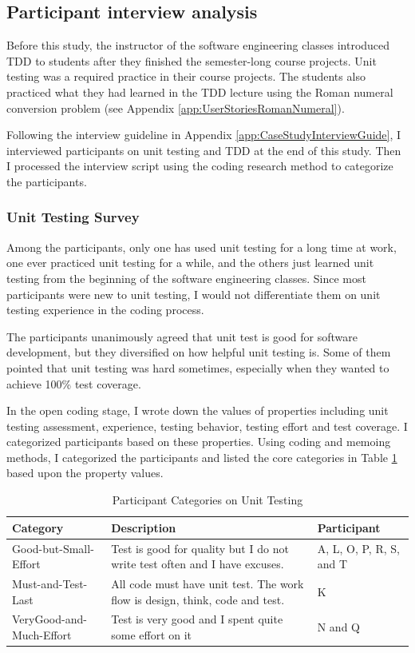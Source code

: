 \subsection{Participant interview analysis}
\label{subsec:ParticipantInterviewAnalysis}
Before this study, the instructor of the software engineering classes 
introduced TDD to students after they finished the semester-long course 
projects. Unit testing was a required practice in their course projects.
The students also practiced what they had learned in the TDD lecture using 
the Roman numeral conversion problem (see Appendix \ref{app:UserStoriesRomanNumeral}).

Following the interview guideline in Appendix \ref{app:CaseStudyInterviewGuide}, 
I interviewed participants on unit testing and TDD at the end of this study. 
Then I processed the interview script using the coding research 
method \cite{Creswell:03,GroundedTheory} to categorize the participants.

\subsubsection{Unit Testing Survey}
Among the participants, only one has used unit testing for a 
long time at work, one ever practiced unit testing for a while, 
and the others just learned unit testing from the beginning of the 
software engineering classes. Since most participants were new to 
unit testing, I would not  differentiate them on unit testing 
experience in the coding process.

The participants unanimously agreed that unit test is good for 
software development, but they diversified on how helpful unit 
testing is. Some of them pointed that unit testing was hard 
sometimes, especially when they wanted to achieve 100\% test 
coverage. 

In the open coding stage, I wrote down the values of properties 
including unit testing assessment, experience, testing behavior, 
testing effort and test coverage. I categorized participants 
based on these properties. Using coding and memoing methods, I 
categorized the participants and listed the core categories in 
Table \ref{tab:UnitTestingCategory} based upon the property 
values.
\begin{table}[!h]
\centering
  \begin{tabular}{|l|p{5cm}|l|}
  \hline
    Category &  Description & Participant \\ \hline
    Good-but-Small-Effort & Test is good for quality but I do not 
                            write test often and I have excuses. & A, L, O, P, R, S, and T \\ \hline
    Must-and-Test-Last & All code must have unit test. The work flow is 
                         design, think, code and test. & K \\ \hline
    VeryGood-and-Much-Effort & Test is very good and I spent quite some effort on it & 
                               N and Q \\ \hline
    \end{tabular}
  \caption{Participant Categories on Unit Testing}\label{tab:UnitTestingCategory}  
\end{table}

